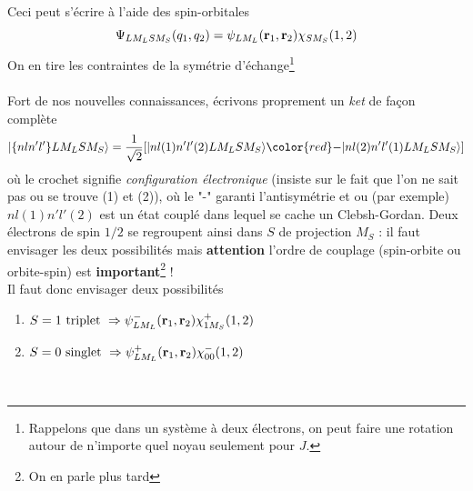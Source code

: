 Ceci peut s'écrire à l'aide des spin-orbitales
\begin{equation}
\Psi_{LM_LSM_S}(q_1,q_2) = \psi_{LM_L}( {\bf r}_1, {\bf r}_2) 
\chi_{SM_S}(1,2)
\end{equation}
On en tire les contraintes de la symétrie d'échange\footnote{Rappelons que dans un système à deux
électrons, on peut faire une rotation autour de n'importe quel noyau seulement pour $J$.}\\

\ \\

Fort de nos nouvelles connaissances, écrivons proprement un \textit{ket} de façon complète
\begin{equation}
\vert \{ nl n'l' \} L M_L S M_S \rangle = 
\frac{1}{\sqrt{2}} [
  \vert nl(1) n'l'(2) L M_L S M_S \rangle
{\color{red} - }
\vert nl(2) n'l'(1) L M_L S M_S \rangle ]
\end{equation}
où le crochet signifie \textit{configuration électronique} (insiste sur le fait que l'on ne sait pas
ou se trouve (1) et (2)), où le "-" garanti l'antisymétrie et ou (par exemple) $ nl(1) n'l'(2)$ 
est un état couplé dans lequel se cache un Clebsh-Gordan. Deux électrons de spin $1/2$ se regroupent
ainsi dans $S$ de projection $M_S$ : il faut envisager les deux possibilités mais \textbf{attention}
l'ordre de couplage (spin-orbite ou orbite-spin) est \textbf{important}\footnote{On en parle plus 
tard} !\\

Il faut donc envisager deux possibilités
\begin{enumerate}
\item $S = 1 ~\mbox{triplet} ~\Rightarrow 
\psi^-_{LM_L}( {\bf r}_1, {\bf r}_2) 
\chi^+_{1M_S}(1,2)$
\item $S=0 ~\mbox{singlet}~ \Rightarrow
\psi^+_{LM_L}( {\bf r}_1, {\bf r}_2) 
\chi^-_{00}(1,2)$
\end{enumerate}\ 

